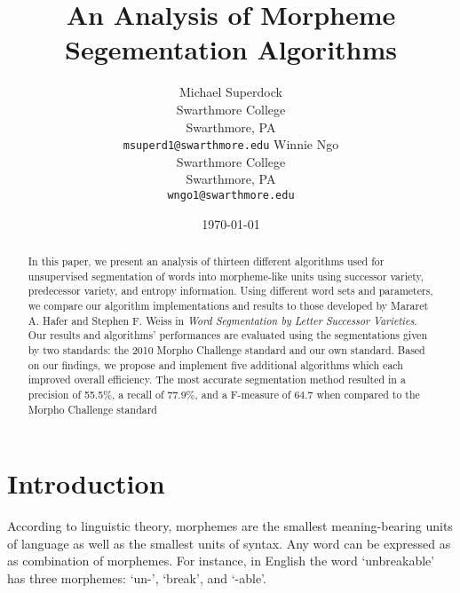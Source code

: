 \documentclass[11pt,letterpaper]{article}
\title{An Analysis of Morpheme Segementation Algorithms}
\author{Michael Superdock\\
  Swarthmore College\\
  Swarthmore, PA\\
  {\tt msuperd1@swarthmore.edu}
  \And
  Winnie Ngo \\
  Swarthmore College\\
  Swarthmore, PA\\
  {\tt wngo1@swarthmore.edu}
}
\date{\today}
\begin{document}
\maketitle

\begin{abstract}
  In this paper, we present an analysis of thirteen different algorithms used for unsupervised segmentation of words into morpheme-like units using successor variety, predecessor variety, and entropy information. Using different word sets and parameters, we compare our algorithm implementations and results to those developed by Mararet A. Hafer and Stephen F. Weiss in \textit{Word Segmentation by Letter Successor Varieties}. Our results and algorithms' performances are evaluated using the segmentations given by two standards: the 2010 Morpho Challenge standard and our own standard. Based on our findings, we propose and implement five additional algorithms which each improved overall efficiency. The most accurate segmentation method resulted in a precision of 55.5\%, a recall of 77.9\%, and a F-measure of 64.7 when compared to the Morpho Challenge standard
\end{abstract}

\section{Introduction}
According to linguistic theory, morphemes are the smallest meaning-bearing units of language as well as the smallest units of syntax. Any word can be expressed as as combination of morphemes. For instance, in English the word `unbreakable' has three morphemes: `un-', `break', and `-able'.\par
\end{document}
